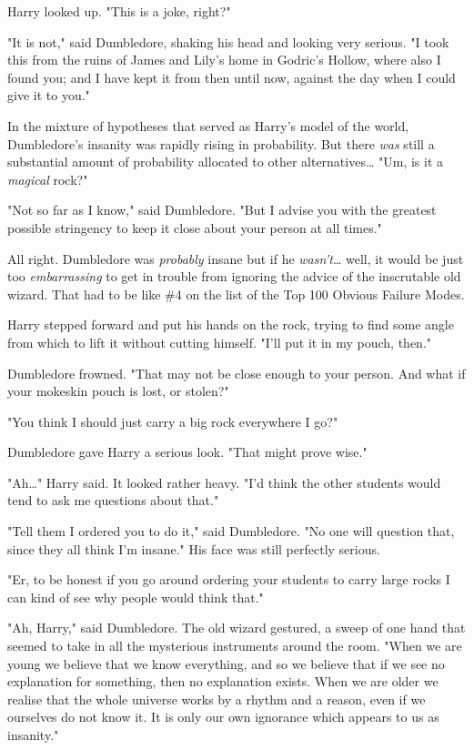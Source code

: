 Harry looked up. "This is a joke, right?"

"It is not," said Dumbledore, shaking his head and looking very serious. "I
took this from the ruins of James and Lily's home in Godric's Hollow, where
also I found you; and I have kept it from then until now, against the day when
I could give it to you."

In the mixture of hypotheses that served as Harry's model of the world,
Dumbledore's insanity was rapidly rising in probability. But there \emph{was}
still a substantial amount of probability allocated to other
alternatives{\ldots} "Um, is it a \emph{magical} rock?"

"Not so far as I know," said Dumbledore. "But I advise you with the greatest
possible stringency to keep it close about your person at all times."

All right. Dumbledore was \emph{probably} insane but if he
\emph{wasn't}{\ldots} well, it would be just too \emph{embarrassing} to get in
trouble from ignoring the advice of the inscrutable old wizard. That had to be
like \#4 on the list of the Top 100 Obvious Failure Modes.

Harry stepped forward and put his hands on the rock, trying to find some angle
from which to lift it without cutting himself. "I'll put it in my pouch, then."

Dumbledore frowned. "That may not be close enough to your person. And what if
your mokeskin pouch is lost, or stolen?"

"You think I should just carry a big rock everywhere I go?"

Dumbledore gave Harry a serious look. "That might prove wise."

"Ah{\ldots}" Harry said. It looked rather heavy. "I'd think the other students
would tend to ask me questions about that."

"Tell them I ordered you to do it," said Dumbledore. "No one will question
that, since they all think I'm insane." His face was still perfectly serious.

"Er, to be honest if you go around ordering your students to carry large rocks
I can kind of see why people would think that."

"Ah, Harry," said Dumbledore. The old wizard gestured, a sweep of one hand that
seemed to take in all the mysterious instruments around the room. "When we are
young we believe that we know everything, and so we believe that if we see no
explanation for something, then no explanation exists. When we are older we
realise that the whole universe works by a rhythm and a reason, even if we
ourselves do not know it. It is only our own ignorance which appears to us as
insanity."

